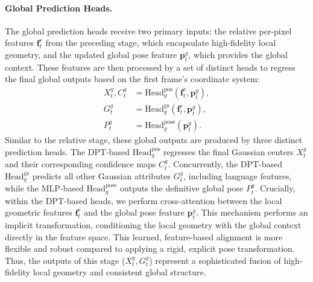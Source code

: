 \paragraph{Global Prediction Heads.}
The global prediction heads receive two primary inputs: the relative per-pixel features $\mathbf{f}_t^r$ from the preceding stage, which encapsulate high-fidelity local geometry, and the updated global pose feature $\mathbf{p}_t^g$, which provides the global context. These features are then processed by a set of distinct heads to regress the final global outputs based on the first frame's coordinate system:
\begin{align}
    X_t^g, C_t^g &= \text{Head}_g^{\text{pos}}(\mathbf{f}_t^r, \mathbf{p}_t^g), \\
    G_t^g &= \text{Head}_g^{\text{gs}}(\mathbf{f}_t^r, \mathbf{p}_t^g), \\
    P_t^g &= \text{Head}_g^{\text{pose}}(\mathbf{p}_t^g).
\end{align}
Similar to the relative stage, these global outputs are produced by three distinct prediction heads. The DPT-based $\text{Head}_g^{\text{pos}}$ regresses the final Gaussian centers $X_t^g$ and their corresponding confidence maps $C_t^g$. Concurrently, the DPT-based $\text{Head}_g^{\text{gs}}$ predicts all other Gaussian attributes $G_t^g$, including language features, while the MLP-based $\text{Head}_g^{\text{pose}}$ outputs the definitive global pose $P_t^g$. Crucially, within the DPT-based heads, we perform cross-attention between the local geometric features $\mathbf{f}_t^r$ and the global pose feature $\mathbf{p}_t^g$. This mechanism performs an implicit transformation, conditioning the local geometry with the global context directly in the feature space. This learned, feature-based alignment is more flexible and robust compared to applying a rigid, explicit pose transformation. Thus, the outputs of this stage ($X_t^g, G_t^g$) represent a sophisticated fusion of high-fidelity local geometry and consistent global structure.


